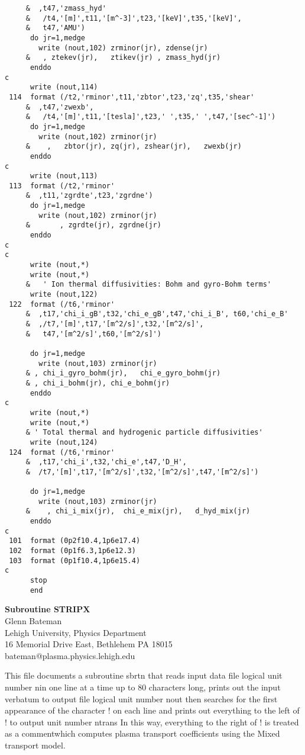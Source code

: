 \begin{verbatim}
     &  ,t47,'zmass_hyd'
     &   /t4,'[m]',t11,'[m^-3]',t23,'[keV]',t35,'[keV]',
     &   t47,'AMU')
      do jr=1,medge
        write (nout,102) zrminor(jr), zdense(jr)
     &   , ztekev(jr),   ztikev(jr) , zmass_hyd(jr)
      enddo
c
      write (nout,114)
 114  format (/t2,'rminor',t11,'zbtor',t23,'zq',t35,'shear'
     &  ,t47,'zwexb',
     &   /t4,'[m]',t11,'[tesla]',t23,' ',t35,' ',t47,'[sec^-1]')
      do jr=1,medge
        write (nout,102) zrminor(jr)
     &    ,   zbtor(jr), zq(jr), zshear(jr),   zwexb(jr)
      enddo
c
      write (nout,113)
 113  format (/t2,'rminor'
     &  ,t11,'zgrdte',t23,'zgrdne')
      do jr=1,medge
        write (nout,102) zrminor(jr)
     &       , zgrdte(jr), zgrdne(jr)
      enddo
c
c
      write (nout,*)
      write (nout,*)
     &   ' Ion thermal diffusivities: Bohm and gyro-Bohm terms'
      write (nout,122)
 122  format (/t6,'rminor'
     &  ,t17,'chi_i_gB',t32,'chi_e_gB',t47,'chi_i_B', t60,'chi_e_B'
     &  ,/t7,'[m]',t17,'[m^2/s]',t32,'[m^2/s]',
     &   t47,'[m^2/s]',t60,'[m^2/s]')

      do jr=1,medge
        write (nout,103) zrminor(jr)
     & , chi_i_gyro_bohm(jr),   chi_e_gyro_bohm(jr)
     & , chi_i_bohm(jr), chi_e_bohm(jr)
      enddo
c
      write (nout,*)
      write (nout,*)
     & ' Total thermal and hydrogenic particle diffusivities'
      write (nout,124)
 124  format (/t6,'rminor'
     &  ,t17,'chi_i',t32,'chi_e',t47,'D_H',
     &  /t7,'[m]',t17,'[m^2/s]',t32,'[m^2/s]',t47,'[m^2/s]')

      do jr=1,medge
        write (nout,103) zrminor(jr)
     &    , chi_i_mix(jr),  chi_e_mix(jr),   d_hyd_mix(jr)
      enddo
c
 101  format (0p2f10.4,1p6e17.4)
 102  format (0p1f6.3,1p6e12.3)
 103  format (0p1f10.4,1p6e15.4)
c
      stop
      end
\end{verbatim}
%
%
\begin{center}
\Large {\bf Subroutine STRIPX} \\
\vspace{1pc} \normalsize
Glenn Bateman \\
 Lehigh University, Physics Department \\
16 Memorial Drive East, Bethlehem PA 18015 \\
bateman@plasma.physics.lehigh.edu \\
\end{center}

This file documents a subroutine sbrtn that reads input data file
logical unit number nin one line at a time up to 80 characters long,
prints out the input verbatum to output file logical unit number nout
then searches for the first appearance of the character ! on each line
and prints out everything to the left of ! to output unit number ntrans
In this way, everything to the right of ! is treated as a commentwhich computes
plasma transport coefficients using the Mixed transport model.

